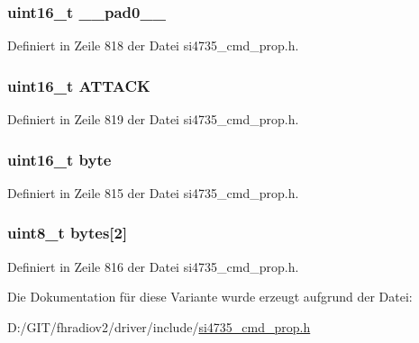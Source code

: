 \subsubsection[{\+\_\+\+\_\+pad0\+\_\+\+\_\+}]{\setlength{\rightskip}{0pt plus 5cm}uint16\+\_\+t \+\_\+\+\_\+pad0\+\_\+\+\_\+}\label{unionfm__agc__atk__rate_a77132c2c26a75f5b8751b235cda23828}


Definiert in Zeile 818 der Datei si4735\+\_\+cmd\+\_\+prop.\+h.

\hypertarget{unionfm__agc__atk__rate_a23a6aee9d921440c53996214126047a3}{}
\subsubsection[{A\+T\+T\+A\+C\+K}]{\setlength{\rightskip}{0pt plus 5cm}uint16\+\_\+t A\+T\+T\+A\+C\+K}\label{unionfm__agc__atk__rate_a23a6aee9d921440c53996214126047a3}


Definiert in Zeile 819 der Datei si4735\+\_\+cmd\+\_\+prop.\+h.

\hypertarget{unionfm__agc__atk__rate_ab0549c1b5ea980a02e7eab77e21fea49}{}
\subsubsection[{byte}]{\setlength{\rightskip}{0pt plus 5cm}uint16\+\_\+t byte}\label{unionfm__agc__atk__rate_ab0549c1b5ea980a02e7eab77e21fea49}


Definiert in Zeile 815 der Datei si4735\+\_\+cmd\+\_\+prop.\+h.

\hypertarget{unionfm__agc__atk__rate_a46e4c05d20a047ec169f60d3167e912e}{}
\subsubsection[{bytes}]{\setlength{\rightskip}{0pt plus 5cm}uint8\+\_\+t bytes\mbox{[}2\mbox{]}}\label{unionfm__agc__atk__rate_a46e4c05d20a047ec169f60d3167e912e}


Definiert in Zeile 816 der Datei si4735\+\_\+cmd\+\_\+prop.\+h.



Die Dokumentation für diese Variante wurde erzeugt aufgrund der Datei\+:\begin{DoxyCompactItemize}
\item 
D\+:/\+G\+I\+T/fhradiov2/driver/include/\hyperlink{si4735__cmd__prop_8h}{si4735\+\_\+cmd\+\_\+prop.\+h}\end{DoxyCompactItemize}
